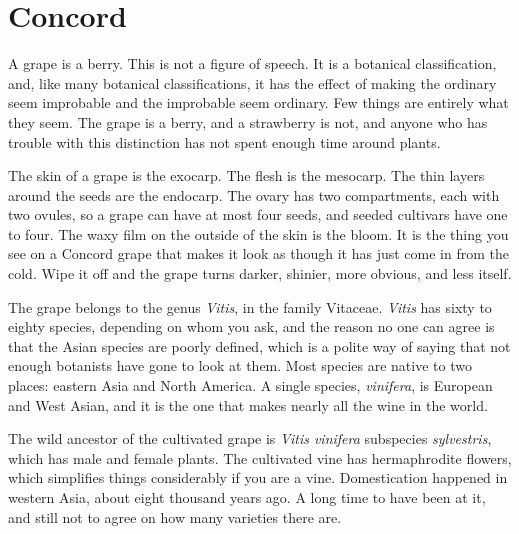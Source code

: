 \chapter{Concord}

A grape is a berry. This is not a figure of speech. It is a botanical
classification, and, like many botanical classifications, it has the effect
of making the ordinary seem improbable and the improbable seem
ordinary. Few things are entirely what they seem. The grape is a
berry, and a strawberry is not, and anyone who has trouble with this
distinction has not spent enough time around plants.

The skin of a grape is the exocarp. The flesh is the mesocarp. The thin
layers around the seeds are the endocarp. The ovary has two compartments,
each with two ovules, so a grape can have at most four seeds, and seeded
cultivars have one to four. The waxy film on the outside of the skin is the
bloom. It is the thing you see on a Concord grape that makes it look as
though it has just come in from the cold. Wipe it off and the grape turns
darker, shinier, more obvious, and less itself.

The grape belongs to the genus \textit{Vitis}, in the family
Vitaceae. \textit{Vitis} has sixty to eighty species,
depending on whom you ask, and the reason no one can agree is that the
Asian species are poorly defined, which is a polite way of saying that not
enough botanists have gone to look at them. Most species are native to two
places: eastern Asia and North America. A single species,
\textit{vinifera}, is European and West Asian, and it is the one that makes
nearly all the wine in the world.

The wild ancestor of the cultivated grape is \textit{Vitis vinifera}
subspecies \textit{sylvestris}, which has male and female plants. The
cultivated vine has hermaphrodite flowers, which simplifies things
considerably if you are a vine. Domestication happened in western Asia,
about eight thousand years ago. A long time to have been at it, and still
not to agree on how many varieties there are.

